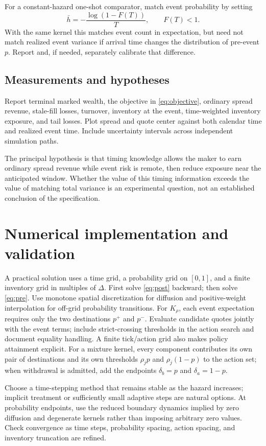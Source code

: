 \documentclass[11pt]{article}
\newcommand{\1}{\mathbf 1}
\begin{document}
For a constant-hazard one-shot comparator, match event probability by setting
\begin{equation}
 \bar h=-\frac{\log(1-F(T))}{T},\qquad F(T)<1.
\end{equation}
With the same kernel this matches event count in expectation, but need not
match realized event variance if arrival time changes the distribution of
pre-event $p$. Report and, if needed, separately calibrate that difference.

\subsection{Measurements and hypotheses}
Report terminal marked wealth, the objective in \eqref{eq:objective}, ordinary
spread revenue, stale-fill losses, turnover, inventory at the event, time-weighted
inventory exposure, and tail losses. Plot spread and quote center against both
calendar time and realized event time. Include uncertainty intervals across
independent simulation paths.

The principal hypothesis is that timing knowledge allows the maker to earn
ordinary spread revenue while event risk is remote, then reduce exposure near
the anticipated window. Whether the value of this timing information exceeds
the value of matching total variance is an experimental question, not an
established conclusion of the specification.

\section{Numerical implementation and validation}
A practical solution uses a time grid, a probability grid on $[0,1]$, and a
finite inventory grid in multiples of $\Delta$. First solve \eqref{eq:post}
backward; then solve \eqref{eq:pre}. Use monotone spatial discretization for
diffusion and positive-weight interpolation for off-grid probability transitions.
For $K_\rho$, each event expectation requires only the two destinations
$p^+$ and $p^-$. Evaluate candidate quotes jointly with the event terms;
include strict-crossing thresholds in the action search and document equality
handling. A finite tick/action grid also makes policy attainment explicit.
For a mixture kernel, every component contributes its own pair of
destinations and its own thresholds $\rho_jp$ and $\rho_j(1-p)$ to the action set;
when withdrawal is admitted, add the endpoints $\delta_b=p$ and $\delta_a=1-p$.

Choose a time-stepping method that remains stable as the hazard increases;
implicit treatment or sufficiently small adaptive steps are natural options.
At probability endpoints, use the reduced boundary dynamics implied by zero
diffusion and degenerate kernels rather than imposing arbitrary zero values.
Check convergence as time steps, probability spacing, action spacing, and
inventory truncation are refined.
\end{document}
